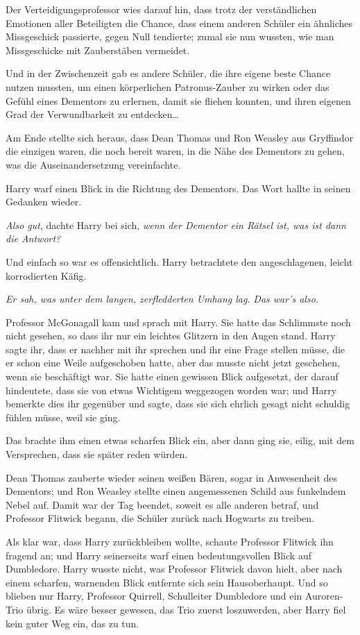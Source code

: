 {Der Verteidigungsprofessor wies darauf hin, dass trotz der verständlichen Emotionen aller Beteiligten die Chance, dass einem anderen Schüler ein ähnliches Missgeschick passierte, gegen Null tendierte; zumal sie nun wussten, wie man Missgeschicke mit Zauberstäben vermeidet.

Und in der Zwischenzeit gab es andere Schüler, die ihre eigene beste Chance nutzen mussten, um einen körperlichen Patronus-Zauber zu wirken oder das Gefühl eines Dementors zu erlernen, damit sie fliehen konnten, und ihren eigenen Grad der Verwundbarkeit zu entdecken…

Am Ende stellte sich heraus, dass Dean Thomas und Ron Weasley aus Gryffindor die einzigen waren, die noch bereit waren, in die Nähe des Dementors zu gehen, was die Auseinandersetzung vereinfachte.

Harry warf einen Blick in die Richtung des Dementors. Das Wort hallte in seinen Gedanken wieder.

\emph{Also gut}, dachte Harry bei sich, \emph{wenn der Dementor ein Rätsel ist, was ist dann die Antwort?}

Und einfach so war es offensichtlich. Harry betrachtete den angeschlagenen, leicht korrodierten Käfig.

\emph{Er sah, was unter dem langen, zerfledderten Umhang lag.} \emph{Das war's also.}

Professor McGonagall kam und sprach mit Harry. Sie hatte das Schlimmste noch nicht gesehen, so dass ihr nur ein leichtes Glitzern in den Augen stand. Harry sagte ihr, dass er nachher mit ihr sprechen und ihr eine Frage stellen müsse, die er schon eine Weile aufgeschoben hatte, aber das musste nicht jetzt geschehen, wenn sie beschäftigt war. Sie hatte einen gewissen Blick aufgesetzt, der darauf hindeutete, dass sie von etwas Wichtigem weggezogen worden war; und Harry bemerkte dies ihr gegenüber und sagte, dass sie sich ehrlich gesagt nicht schuldig fühlen müsse, weil sie ging.

Das brachte ihm einen etwas scharfen Blick ein, aber dann ging sie, eilig, mit dem Versprechen, dass sie später reden würden.

Dean Thomas zauberte wieder seinen weißen Bären, sogar in Anwesenheit des Dementors; und Ron Weasley stellte einen angemessenen Schild aus funkelndem Nebel auf. Damit war der Tag beendet, soweit es alle anderen betraf, und Professor Flitwick begann, die Schüler zurück nach Hogwarts zu treiben.

Als klar war, dass Harry zurückbleiben wollte, schaute Professor Flitwick ihn fragend an; und Harry seinerseits warf einen bedeutungsvollen Blick auf Dumbledore. Harry wusste nicht, was Professor Flitwick davon hielt, aber nach einem scharfen, warnenden Blick entfernte sich sein Hausoberhaupt. Und so blieben nur Harry, Professor Quirrell, Schulleiter Dumbledore und ein Auroren-Trio übrig. Es wäre besser gewesen, das Trio zuerst loszuwerden, aber Harry fiel kein guter Weg ein, das zu tun.

}
